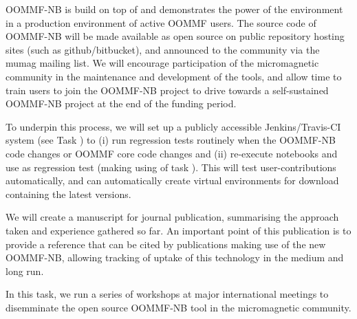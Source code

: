 \begin{workpackage}[id=dissem,wphases=18-48!.5,
  title=Dissemination,
  SARM=1,
  USORM=7,
  USHRM=8,
  USRM=24
]
\begin{tasklist}
\begin{task}[id=dissemination-of-oommf-nb-virtual-environment,
  title=Dissemination of OOMMF-NB virtual environment]
  OOMMF-NB is build on top of \TheProject and demonstrates the power
  of the environment in a production environment of active OOMMF users. 
  The source code of OOMMF-NB will be made available as open source on
  public repository hosting sites (such as github/bitbucket), and
  announced to the community via the mumag mailing list. We will
  encourage participation of the micromagnetic community in the
  maintenance and development of the tools, and allow time to train
  users to join the OOMMF-NB project to drive towards a self-sustained
  OOMMF-NB project at the end of the funding period.

  To underpin this process, we will set up a publicly accessible Jenkins/Travis-CI system
  (see Task ) to (i) run regression tests routinely when the
  OOMMF-NB code changes or OOMMF core code changes and (ii) re-execute notebooks and use
  as regression test (making using of task ). This will
  test user-contributions automatically, and can automatically create virtual environments
  for download containing the latest versions.

  We will create a manuscript for journal publication, summarising the
  approach taken and experience gathered so far. An important point of
  this publication is to provide a reference that can be cited by
  publications making use of the new OOMMF-NB, allowing tracking of
  uptake of this technology in the medium and long run.
\end{task}

\begin{task}[title=OOMMF-NB dissemination workshops,
id=dissemination-of-oommf-nb-workshops]
  
  In this task, we run a series of workshops at major international
  meetings to disemminate the open source OOMMF-NB tool in the
  micromagnetic community.


\end{task}
\end{tasklist}
\end{workpackage}
